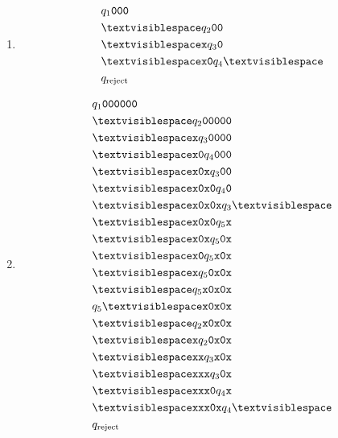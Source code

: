 \documentclass[11pt]{article}
\begin{document}
\begin{enumerate}
{\begin{enumerate}
\begin{align*}
        &\tvs{\tt x}q_3\tvs\\
        &\qrej
    \end{align*}
    \item \begin{align*}
        &q_1{\tt 000}\\
        &\tvs q_2{\tt 00}\\
        &\tvs{\tt x}q_3{\tt 0}\\
        &\tvs{\tt x0}q_4\tvs\\
        &\qrej
    \end{align*}
    \item \begin{align*}
        &q_1{\tt 000000}\\
        &\tvs q_2{\tt 00000}\\
        &\tvs{\tt x}q_3{\tt 0000}\\
        &\tvs{\tt x0}q_4{\tt 000}\\
        &\tvs{\tt x0x}q_3{\tt 00}\\
        &\tvs{\tt x0x0}q_4{\tt 0}\\
        &\tvs{\tt x0x0x}q_3\tvs\\
        &\tvs{\tt x0x0}q_5{\tt x}\\
        &\tvs{\tt x0x}q_5{\tt 0x}\\
        &\tvs{\tt x0}q_5{\tt x0x}\\
        &\tvs{\tt x}q_5{\tt 0x0x}\\
        &\tvs q_5{\tt x0x0x}\\
        &q_5\tvs{\tt x0x0x}\\
        &\tvs q_2{\tt x0x0x}\\
        &\tvs{\tt x}q_2{\tt 0x0x}\\
        &\tvs{\tt xx}q_3{\tt x0x}\\
        &\tvs{\tt xxx}q_3{\tt 0x}\\
        &\tvs{\tt xxx0}q_4{\tt x}\\
        &\tvs{\tt xxx0x}q_4\tvs\\
        &\qrej
    \end{align*}
\end{enumerate}
}



\end{enumerate}
\end{document}
